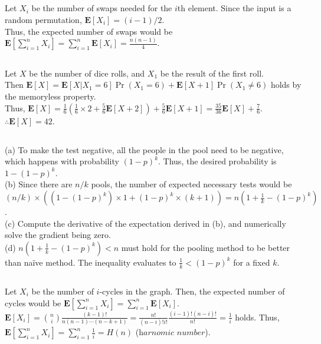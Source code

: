 \documentclass{article}
\begin{document}
\subsection{}
Let $X_i$ be the number of swaps needed for the $i$th element. Since the input is a random permutation, $\textbf{E}[X_i]=(i-1)/2$.\\
Thus, the expected number of swaps would be $\textbf{E}[\sum\limits_{i=1}^{n}X_i]=\sum\limits_{i=1}^n\textbf{E}[X_i]=\frac{n(n-1)}{4}$.
\subsection{}
Let $X$ be the number of dice rolls, and $X_1$ be the result of the first roll.\\
Then $\textbf{E}[X]=\textbf{E}[X|X_1=6]\Pr(X_1=6)+\textbf{E}[X+1]\Pr(X_1\neq 6)$ holds by the memoryless property.\\
Thus, $\textbf{E}[X]=\frac{1}{6}(\frac{1}{6}\times2+\frac{5}{6}\textbf{E}[X+2])+\frac{5}{6}\textbf{E}[X+1]=\frac{35}{36}\textbf{E}[X]+\frac{7}{6}$.
$\therefore \textbf{E}[X]=42$.
\subsection{}
(a) To make the test negative, all the people in the pool need to be negative, which happens with probability $(1-p)^k$. Thus, the desired probability is $1-(1-p)^k$.\\
(b) Since there are $n/k$ pools, the number of expected necessary tests would be $(n/k)\times((1-(1-p)^k)\times1+(1-p)^k\times(k+1))=n(1+\frac{1}{k}-(1-p)^k)$.\\
(c) Compute the derivative of the expectation derived in (b), and numerically solve the gradient being zero.\\
(d) $n(1+\frac{1}{k}-(1-p)^k)<n$ must hold for the pooling method to be better than naïve method. The inequality evaluates to $\frac{1}{k}<(1-p)^k$ for a fixed $k$.
\subsection{}
Let $X_i$ be the number of $i$-cycles in the graph. Then, the expected number of cycles would be $\textbf{E}[\sum\limits_{i=1}^nX_i]=\sum\limits_{i=1}^n\textbf{E}[X_i]$.\\
$\textbf{E}[X_i]=\binom{n}{i}\frac{(k-1)!}{n(n-1)\cdots(n-k+1)}=\frac{n!}{(n-i)!i!}\frac{(i-1)!(n-i)!}{n!}=\frac{1}{i}$ holds.
Thus, $\textbf{E}[\sum\limits_{i=1}^nX_i]=\sum\limits_{i=1}^n\frac{1}{i}=H(n)$ ($\textit{harnomic number}$).
\end{document}
